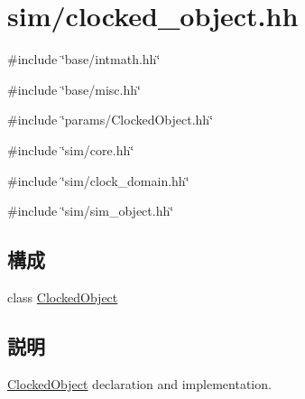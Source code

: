 \hypertarget{clocked__object_8hh}{
\section{sim/clocked\_\-object.hh}
\label{clocked__object_8hh}
}
{\ttfamily \#include \char`\"{}base/intmath.hh\char`\"{}}\par
{\ttfamily \#include \char`\"{}base/misc.hh\char`\"{}}\par
{\ttfamily \#include \char`\"{}params/ClockedObject.hh\char`\"{}}\par
{\ttfamily \#include \char`\"{}sim/core.hh\char`\"{}}\par
{\ttfamily \#include \char`\"{}sim/clock\_\-domain.hh\char`\"{}}\par
{\ttfamily \#include \char`\"{}sim/sim\_\-object.hh\char`\"{}}\par
\subsection*{構成}
\begin{DoxyCompactItemize}
\item 
class \hyperlink{classClockedObject}{ClockedObject}
\end{DoxyCompactItemize}


\subsection{説明}
\hyperlink{classClockedObject}{ClockedObject} declaration and implementation. 